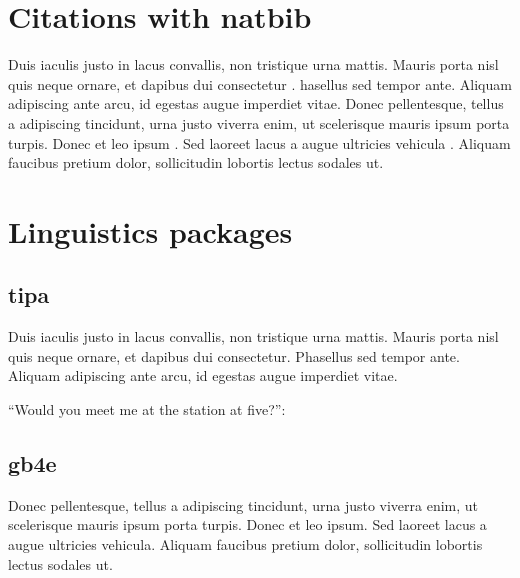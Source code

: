 \documentclass[10pt]{article}
\begin{document}
\section{Citations with natbib}

Duis iaculis justo in lacus convallis, non tristique urna mattis. Mauris porta nisl quis neque ornare, et dapibus dui consectetur \cite{Halle1997}. \citet{labov1969} hasellus sed tempor ante. Aliquam adipiscing ante arcu, id egestas augue imperdiet vitae. Donec pellentesque, tellus a adipiscing tincidunt, urna justo viverra enim, ut scelerisque mauris ipsum porta turpis. Donec et leo ipsum \cite{chomsky1998,chomsky2001}. Sed laoreet lacus a augue ultricies vehicula \cite[cf.][p.~402]{mcfadden2004}. Aliquam faucibus pretium dolor, sollicitudin lobortis lectus sodales ut.

\section{Linguistics packages}

\subsection{tipa}

Duis iaculis justo in lacus convallis, non tristique urna mattis. Mauris porta nisl quis neque ornare, et dapibus dui consectetur. Phasellus sed tempor ante. Aliquam adipiscing ante arcu, id egestas augue imperdiet vitae.

``Would you meet me at the station at five?'':


\textipa{wUdZjuw: mijPmij: \ae \|[t\textcorner D@ "steIS\s{n} \ae t\textcorner faI:\r*v}



\subsection{gb4e}

Donec pellentesque, tellus a adipiscing tincidunt, urna justo viverra enim, ut scelerisque mauris ipsum porta turpis. Donec et leo ipsum. Sed laoreet lacus a augue ultricies vehicula. Aliquam faucibus pretium dolor, sollicitudin lobortis lectus sodales ut.
\end{document}
